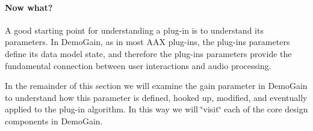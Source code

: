 \hypertarget{a00324_subsubsection__now_what}{}\paragraph{Now what?}\label{a00324_subsubsection__now_what}
A good starting point for understanding a plug-\/in is to understand its parameters. In Demo\+Gain, as in most A\+A\+X plug-\/ins, the plug-\/in\textquotesingle{}s parameters define its data model state, and therefore the plug-\/in\textquotesingle{}s parameters provide the fundamental connection between user interactions and audio processing.

In the remainder of this section we will examine the gain parameter in Demo\+Gain to understand how this parameter is defined, hooked up, modified, and eventually applied to the plug-\/in algorithm. In this way we will \char`\"{}visit\char`\"{} each of the core design components in Demo\+Gain.

